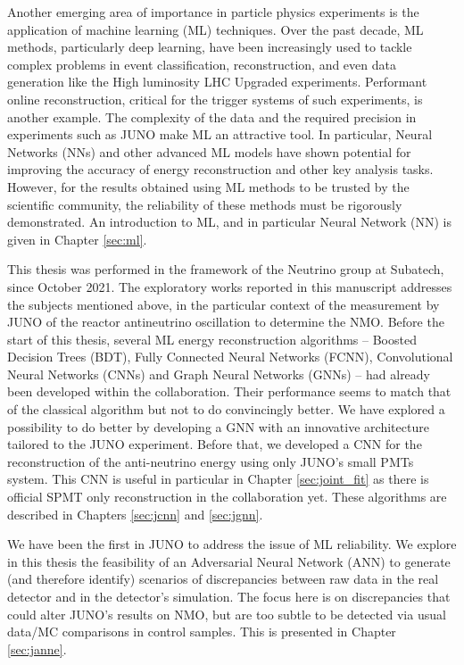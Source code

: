 \hfill

Another emerging area of importance in particle physics experiments is the application of machine learning (ML) techniques. Over the past decade, ML methods, particularly deep learning, have been increasingly used to tackle complex problems in event classification, reconstruction, and even data generation like the High luminosity LHC Upgraded experiments. Performant online reconstruction, critical for the trigger systems of such
 experiments, is another example. The complexity of the data and the required precision in experiments such as JUNO make ML an attractive tool. In particular, Neural Networks (NNs) and other advanced ML models have shown potential for improving the accuracy of energy reconstruction and other key analysis tasks. However, for the results obtained using ML methods to be trusted by the scientific community, the reliability of these methods must be rigorously demonstrated.
An introduction to ML, and in particular Neural Network (NN) is given in Chapter \ref{sec:ml}.

\hfill

This thesis was performed in the framework of the Neutrino group at Subatech, since October 2021. The exploratory works reported in this manuscript addresses the subjects mentioned above, in the particular context of the measurement by JUNO of the reactor antineutrino
oscillation to determine the NMO.
Before the start of this thesis, several ML energy reconstruction algorithms -- Boosted Decision Trees (BDT), Fully Connected Neural Networks (FCNN), Convolutional Neural Networks (CNNs) and Graph Neural Networks (GNNs) --  had already been developed within
the collaboration. Their performance seems to match that of the classical algorithm but not to do convincingly better. We have explored a possibility
to do better by developing a GNN with an innovative architecture tailored to the JUNO experiment. Before that, we developed a CNN for the reconstruction of the anti-neutrino
energy using only JUNO's small PMTs system.
This CNN is useful in particular in Chapter \ref{sec:joint_fit} as there is official SPMT only reconstruction in the collaboration yet. These algorithms are described in Chapters \ref{sec:jcnn} and \ref{sec:jgnn}.

We have been the first in JUNO to address the issue of ML reliability.
We explore in this thesis the feasibility of an Adversarial Neural Network (ANN) to generate (and therefore identify) scenarios of discrepancies
between raw data in the real detector and in the detector's simulation.
The focus here is on discrepancies that could alter JUNO's results on NMO, but are too subtle to be detected via usual data/MC comparisons in control samples.
This is presented in Chapter \ref{sec:janne}.


